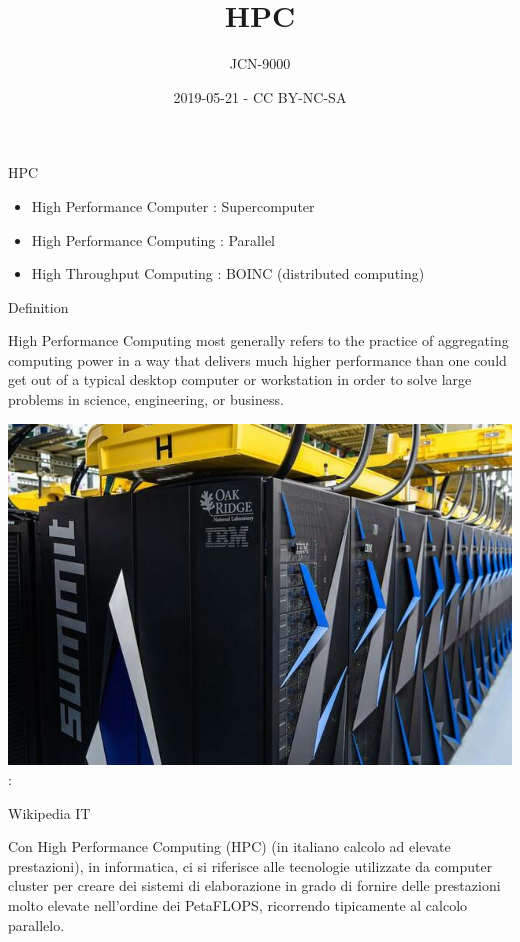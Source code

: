 \documentclass[ignorenonframetext,]{beamer}
\title{HPC}
\author{JCN-9000}
\date{2019-05-21 - CC BY-NC-SA}
\providecommand{\tightlist}{%
  \setlength{\itemsep}{0pt}\setlength{\parskip}{0pt}}
\begin{document}
\frame{\titlepage}

\begin{frame}{HPC}

\begin{itemize}
\tightlist
\item
  High Performance Computer : Supercomputer
\item
  High Performance Computing : Parallel
\item
  High Throughput Computing : BOINC (distributed computing)
\end{itemize}

\end{frame}

\begin{frame}{Definition}


\begin{description}
\tightlist
\item[\href{https://insidehpc.com/hpc-basic-training/what-is-hpc/}{HPC}]
High Performance Computing most generally refers to the practice of
aggregating computing power in a way that delivers much higher
performance than one could get out of a typical desktop computer or
workstation in order to solve large problems in science, engineering, or
business.
\end{description}

\includegraphics{images/Summit_small.jpg} :

\end{frame}

\begin{frame}{Wikipedia IT}

\begin{description}
\tightlist
\item[\href{https://it.wikipedia.org/wiki/High_Performance_Computing}{HPC}]
Con High Performance Computing (HPC) (in italiano calcolo ad elevate
prestazioni), in informatica, ci si riferisce alle tecnologie utilizzate
da computer cluster per creare dei sistemi di elaborazione in grado di
fornire delle prestazioni molto elevate nell'ordine dei PetaFLOPS,
ricorrendo tipicamente al calcolo parallelo.
\end{description}


\end{frame}
\end{document}
